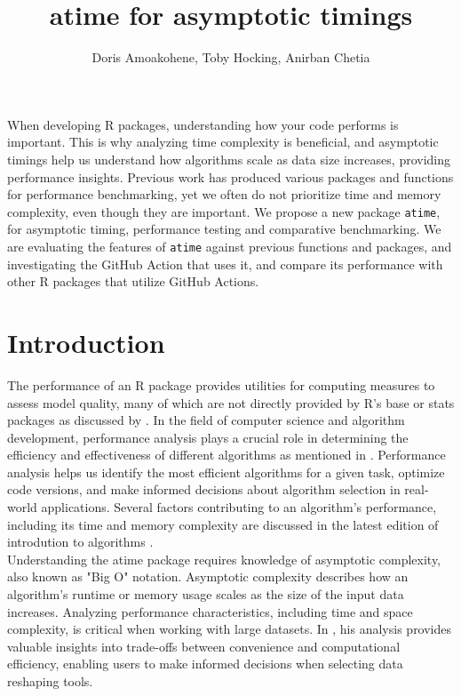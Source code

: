 \title{atime for asymptotic timings }
\author{Doris Amoakohene, Toby Hocking, Anirban Chetia}

\maketitle

\abstract{}
When developing R packages, understanding how your code performs is important. This is why analyzing time complexity is beneficial, and asymptotic timings help us understand how algorithms scale as data size increases, providing performance insights. Previous work has produced various packages and functions for performance benchmarking, yet we often do not prioritize time and memory complexity, even though they are important.
We propose a new package \texttt{atime}, for asymptotic timing, performance testing and comparative benchmarking. We are evaluating the features of  \texttt{atime} against previous functions and packages, and investigating the GitHub Action that uses it, and compare its performance with other R packages that utilize GitHub Actions.


\section{Introduction}
The performance of an R package provides utilities for computing measures to assess model quality, many of which are not directly provided by R's base or stats packages as discussed by \cite{system.time}. In the field of computer science and algorithm development, performance analysis plays a crucial role in determining the efficiency and effectiveness of different algorithms as mentioned in \cite{knuth1997art}. Performance analysis helps us identify the most efficient algorithms for a given task, optimize code versions, and make informed decisions about algorithm selection in real-world applications. Several factors contributing to an algorithm's performance, including its time and memory complexity are discussed in the latest edition of introdution to algorithms \cite{cormen2022introduction} .\\

\noindent Understanding the atime package requires knowledge of asymptotic complexity, also known as "Big O" notation. Asymptotic complexity describes how an algorithm's runtime or memory usage scales as the size of the input data increases. Analyzing performance characteristics, including time and space complexity, is critical when working with large datasets. In \cite{Hocking2021}, his analysis provides valuable insights into trade-offs between convenience and computational efficiency, enabling users to make informed decisions when selecting data reshaping tools.
 
